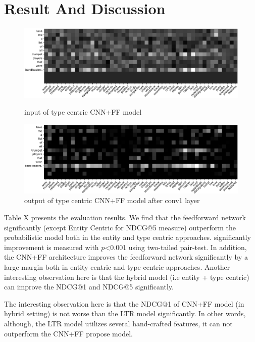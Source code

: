 \section{Result And Discussion}
\begin{figure}
	\includegraphics[width=\textwidth]{leaders_in_cropped.pdf} \caption{input of type centric CNN+FF model}\label{conv1Input}
	\includegraphics[width=\textwidth]{leaders_conv1_cropped.pdf}
	\caption{output of type centric CNN+FF model after conv1 layer}\label{conv1Output}
\end{figure}

Table X presents the evaluation results. We find that the feedforward network significantly (except Entity Centric for NDCG@5 measure) outperform the probabilistic model both in the entity and type centric approaches. significantly improvement is measured with $p$<0.001 using two-tailed pair-test. In addition, the CNN+FF architecture improves the feedforward network significantly by a large margin both in entity centric and type centric approaches. Another interesting observation here is that the hybrid model (i.e entity + type centric) can improve the NDCG@1 and NDCG@5 significantly.

The interesting observation here is that the NDCG@1 of CNN+FF model (in hybrid setting) is not worse than the LTR model significantly. In other words, although, the LTR model utilizes several hand-crafted features, it can not outperform the CNN+FF propose model.

